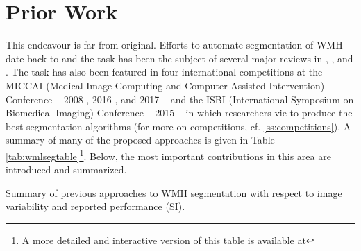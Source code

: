 \section{Prior Work}
This endeavour is far from original. Efforts to automate segmentation of WMH date back to \citeyear{Kapouleas1990} \cite{Kapouleas1990} and the task has been the subject of several major reviews in \citeyear{Llado2012} \cite{Llado2012,Mortazavi2012}, \citeyear{Garcia-Lorenzo2013} \cite{Garcia-Lorenzo2013}, and \citeyear{Caligiuri2015} \cite{Caligiuri2015}. The task has also been featured in four international competitions at the MICCAI (Medical Image Computing and Computer Assisted Intervention) Conference -- 2008 \cite{MSSEG2008}, 2016 \cite{MSSEG2016}, and 2017 \cite{WMHSEG2017} -- and the ISBI (International Symposium on Biomedical Imaging) Conference -- 2015 \cite{MSISBI2015} -- in which researchers vie to produce the best segmentation algorithms (for more on competitions, cf. \ref{ss:competitions}). A summary of many of the proposed approaches is given in Table \ref{tab:wmlsegtable}\footnote{A more detailed and interactive version of this table is available at }. Below, the most important contributions in this area are introduced and summarized.
\begin{table}
  \caption{Summary of previous approaches to WMH segmentation with respect to image variability and reported performance (SI).}
  \footnotesize{\centering{}}
  \label{tab:wmlsegtable}
\end{table}
